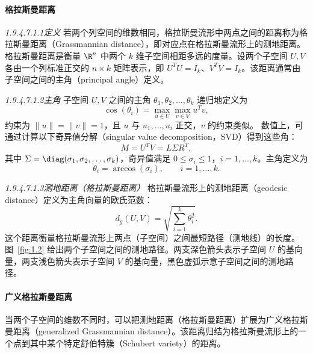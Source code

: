 \paragraph{格拉斯曼距离}
\noindent\textit{1.9.4.7.1.1\quad 定义}\quad
若两个列空间的维数相同，格拉斯曼流形中两点之间的距离称为格拉斯曼距离（Grassmannian distance），即对应点在格拉斯曼流形上的测地距离。格拉斯曼距离是衡量 $\R^n$ 中两个 $k$ 维子空间相距多远的度量。设两个子空间 $U,V$ 各由一个列标准正交的 $n\times k$ 矩阵表示，即 $U^TU=I_k$、$V^TV=I_k$。该距离通常由子空间之间的主角（principal angle）定义。

\smallskip
\noindent\textit{1.9.4.7.1.2\quad 主角}\quad
子空间 $U,V$ 之间的主角 $\theta_1,\theta_2,\ldots,\theta_k$ 递归地定义为
\begin{equation*}
  \cos(\theta_i)=\max_{u\in U}\max_{v\in V}u^Tv,
  \tag{1.8}\label{eq:1.8}
\end{equation*}
约束为 $\lVert u\rVert=\lVert v\rVert=1$，且 $u$ 与 $u_1,\ldots,u_i$ 正交，$v$ 的约束类似。 数值上，可通过计算以下奇异值分解（singular value decomposition，SVD）得到这些角：
\[
  M=U^TV=L\Sigma R^T,
\]
其中 $\Sigma=\diag(\sigma_1,\sigma_2,\ldots,\sigma_k)$，奇异值满足 $0\le\sigma_i\le1$，$i=1,\ldots,k$。主角定义为
\begin{equation*}
  \theta_i=\arccos(\sigma_i),\qquad i=1,\ldots,k.
  \tag{1.9}\label{eq:1.9}
\end{equation*}

\smallskip
\noindent\textit{1.9.4.7.1.3\quad 测地距离（格拉斯曼距离）}\quad
格拉斯曼流形上的测地距离（geodesic distance）定义为主角向量的欧氏范数：
\begin{equation*}
  d_g(U,V)=\sqrt{\sum_{i=1}^k\theta_i^2}.
  \tag{1.10}\label{eq:1.10}
\end{equation*}
这个距离衡量格拉斯曼流形上两点（子空间）之间最短路径（测地线）的长度。图~\ref{fig:1.2} 给出两个子空间之间的测地路径。两支深色箭头表示子空间 $U$ 的基向量，两支浅色箭头表示子空间 $V$ 的基向量，黑色虚弧示意子空间之间的测地路径。

\begin{figure}[htbp]
  \centering
  
\end{figure}

\paragraph{广义格拉斯曼距离}
当两个子空间的维数不同时，可以把测地距离（格拉斯曼距离）扩展为广义格拉斯曼距离（generalized Grassmannian distance）。该距离归结为格拉斯曼流形上的一个点到其中某个特定舒伯特簇（Schubert variety）的距离。

